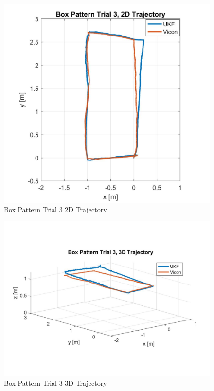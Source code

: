 \begin{figure}[p]
  \centering
    \includegraphics[height=0.6\textwidth]{box3_2d}
  \caption[Box Pattern Trial 3 2D Trajectory]{Box Pattern Trial 3 2D Trajectory.}
  \label{fig:box3_2d}
\end{figure}
\begin{figure}[p]
  \centering
    \includegraphics[height=0.7\textwidth]{box3_3d}
  \caption[Box Pattern Trial 3 3D Trajectory]{Box Pattern Trial 3 3D Trajectory.}
  \label{fig:box3_3d}
\end{figure}
\clearpage

